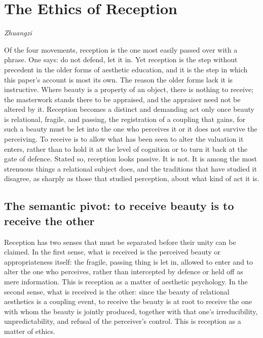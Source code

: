 \section{The Ethics of Reception}
\label{p22:sec:reception}

\epigraph{}{\textit{Zhuangzi}}

\noindent
Of the four movements, reception is the one most easily passed over with a phrase. One says: do not defend, let it in. Yet reception is the step without precedent in the older forms of aesthetic education, and it is the step in which this paper's account is most its own. The reason the older forms lack it is instructive. Where beauty is a property of an object, there is nothing to receive; the masterwork stands there to be appraised, and the appraiser need not be altered by it. Reception becomes a distinct and demanding act only once beauty is relational, fragile, and passing, the registration of a coupling that gains, for such a beauty must be let into the one who perceives it or it does not survive the perceiving. To receive is to allow what has been seen to alter the valuation it enters, rather than to hold it at the level of cognition or to turn it back at the gate of defence. Stated so, reception looks passive. It is not. It is among the most strenuous things a relational subject does, and the traditions that have studied it disagree, as sharply as those that studied perception, about what kind of act it is.

\subsection{The semantic pivot: to receive beauty is to receive the other}
\label{p22:sub:reception-pivot}

Reception has two senses that must be separated before their unity can be claimed. In the first sense, what is received is the perceived beauty or appropriateness itself: the fragile, passing thing is let in, allowed to enter and to alter the one who perceives, rather than intercepted by defence or held off as mere information. This is reception as a matter of aesthetic psychology. In the second sense, what is received is the other: since the beauty of relational aesthetics is a coupling event, to receive the beauty is at root to receive the one with whom the beauty is jointly produced, together with that one's irreducibility, unpredictability, and refusal of the perceiver's control. This is reception as a matter of ethics.

